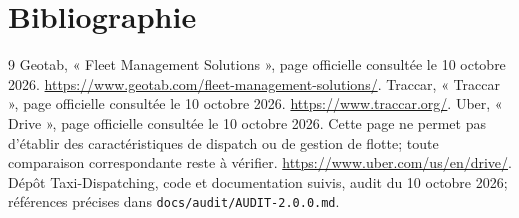 \documentclass[12pt,a4paper]{article}
\begin{document}
\section*{Bibliographie}
\begin{thebibliography}{9}
Geotab, « Fleet Management Solutions », page officielle consultée le 10 octobre 2026.
\url{https://www.geotab.com/fleet-management-solutions/}.
Traccar, « Traccar », page officielle consultée le 10 octobre 2026.
\url{https://www.traccar.org/}.
Uber, « Drive », page officielle consultée le 10 octobre 2026. Cette page ne permet pas d'établir des caractéristiques de dispatch ou de gestion de flotte; toute comparaison correspondante reste à vérifier.
\url{https://www.uber.com/us/en/drive/}.
Dépôt Taxi-Dispatching, code et documentation suivis, audit du 10 octobre 2026; références précises dans \texttt{docs/audit/AUDIT-2.0.0.md}.
\end{thebibliography}

\appendix
\end{document}
